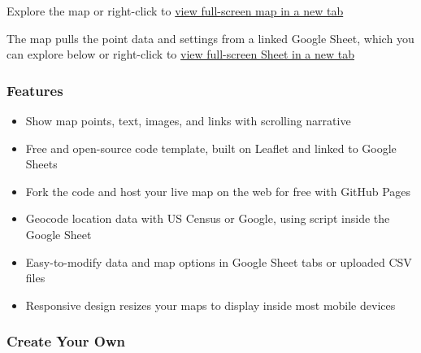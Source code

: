 \documentclass[
  english,
]{book}
\providecommand{\tightlist}{%
  \setlength{\itemsep}{0pt}\setlength{\parskip}{0pt}}
\begin{document}
Explore the map or right-click to \href{https://datavizforall.github.io/leaflet-storymaps-with-google-sheets/}{view full-screen map in a new tab}

The map pulls the point data and settings from a linked Google Sheet, which you can explore below or right-click to \href{https://docs.google.com/spreadsheets/d/1AO6XHL_0JafWZF4KEejkdDNqfuZWUk3SlNlQ6MjlRFM/}{view full-screen Sheet in a new tab}

\hypertarget{features}{%
\subsubsection*{Features}\label{features}}

\begin{itemize}
\tightlist
\item
  Show map points, text, images, and links with scrolling narrative
\item
  Free and open-source code template, built on Leaflet and linked to Google Sheets
\item
  Fork the code and host your live map on the web for free with GitHub Pages
\item
  Geocode location data with US Census or Google, using script inside the Google Sheet
\item
  Easy-to-modify data and map options in Google Sheet tabs or uploaded CSV files
\item
  Responsive design resizes your maps to display inside most mobile devices
\end{itemize}

\hypertarget{create-your-own}{%
\subsubsection*{Create Your Own}\label{create-your-own}}
\end{document}
